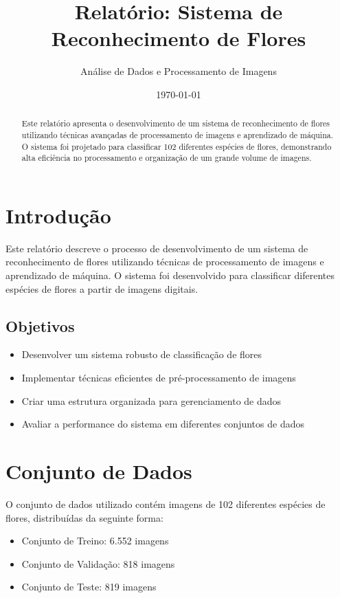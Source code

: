 \documentclass[12pt,a4paper]{article}
\title{Relatório: Sistema de Reconhecimento de Flores}
\author{Análise de Dados e Processamento de Imagens}
\date{\today}
\begin{document}
\maketitle

\begin{abstract}
Este relatório apresenta o desenvolvimento de um sistema de reconhecimento de flores utilizando técnicas avançadas de processamento de imagens e aprendizado de máquina. O sistema foi projetado para classificar 102 diferentes espécies de flores, demonstrando alta eficiência no processamento e organização de um grande volume de imagens.
\end{abstract}

\tableofcontents
\newpage

\section{Introdução}
Este relatório descreve o processo de desenvolvimento de um sistema de reconhecimento de flores utilizando técnicas de processamento de imagens e aprendizado de máquina. O sistema foi desenvolvido para classificar diferentes espécies de flores a partir de imagens digitais.

\subsection{Objetivos}
\begin{itemize}
    \item Desenvolver um sistema robusto de classificação de flores
    \item Implementar técnicas eficientes de pré-processamento de imagens
    \item Criar uma estrutura organizada para gerenciamento de dados
    \item Avaliar a performance do sistema em diferentes conjuntos de dados
\end{itemize}

\section{Conjunto de Dados}
O conjunto de dados utilizado contém imagens de 102 diferentes espécies de flores, distribuídas da seguinte forma:
\begin{itemize}
    \item Conjunto de Treino: 6.552 imagens
    \item Conjunto de Validação: 818 imagens
    \item Conjunto de Teste: 819 imagens
\end{itemize}
\end{document}
